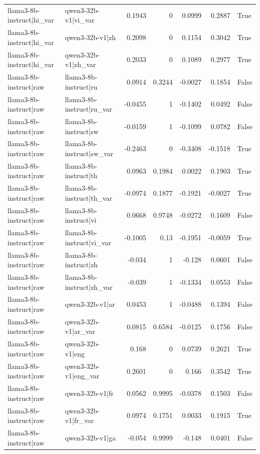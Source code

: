 \begin{table}
\begin{tabular}{l l r r r r l}
llama3-8b-instruct|hi_var & qwen3-32b-v1|vi_var & 0.1943 & 0 & 0.0999 & 0.2887 & True \\
llama3-8b-instruct|hi_var & qwen3-32b-v1|zh & 0.2098 & 0 & 0.1154 & 0.3042 & True \\
llama3-8b-instruct|hi_var & qwen3-32b-v1|zh_var & 0.2033 & 0 & 0.1089 & 0.2977 & True \\
llama3-8b-instruct|raw & llama3-8b-instruct|ru & 0.0914 & 0.3244 & -0.0027 & 0.1854 & False \\
llama3-8b-instruct|raw & llama3-8b-instruct|ru_var & -0.0455 & 1 & -0.1402 & 0.0492 & False \\
llama3-8b-instruct|raw & llama3-8b-instruct|sw & -0.0159 & 1 & -0.1099 & 0.0782 & False \\
llama3-8b-instruct|raw & llama3-8b-instruct|sw_var & -0.2463 & 0 & -0.3408 & -0.1518 & True \\
llama3-8b-instruct|raw & llama3-8b-instruct|th & 0.0963 & 0.1984 & 0.0022 & 0.1903 & True \\
llama3-8b-instruct|raw & llama3-8b-instruct|th_var & -0.0974 & 0.1877 & -0.1921 & -0.0027 & True \\
llama3-8b-instruct|raw & llama3-8b-instruct|vi & 0.0668 & 0.9748 & -0.0272 & 0.1609 & False \\
llama3-8b-instruct|raw & llama3-8b-instruct|vi_var & -0.1005 & 0.13 & -0.1951 & -0.0059 & True \\
llama3-8b-instruct|raw & llama3-8b-instruct|zh & -0.034 & 1 & -0.128 & 0.0601 & False \\
llama3-8b-instruct|raw & llama3-8b-instruct|zh_var & -0.039 & 1 & -0.1334 & 0.0553 & False \\
llama3-8b-instruct|raw & qwen3-32b-v1|ar & 0.0453 & 1 & -0.0488 & 0.1394 & False \\
llama3-8b-instruct|raw & qwen3-32b-v1|ar_var & 0.0815 & 0.6584 & -0.0125 & 0.1756 & False \\
llama3-8b-instruct|raw & qwen3-32b-v1|eng & 0.168 & 0 & 0.0739 & 0.2621 & True \\
llama3-8b-instruct|raw & qwen3-32b-v1|eng_var & 0.2601 & 0 & 0.166 & 0.3542 & True \\
llama3-8b-instruct|raw & qwen3-32b-v1|fr & 0.0562 & 0.9995 & -0.0378 & 0.1503 & False \\
llama3-8b-instruct|raw & qwen3-32b-v1|fr_var & 0.0974 & 0.1751 & 0.0033 & 0.1915 & True \\
llama3-8b-instruct|raw & qwen3-32b-v1|ga & -0.054 & 0.9999 & -0.148 & 0.0401 & False \\

\end{tabular}
\end{table}
